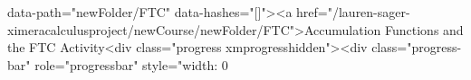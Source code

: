data-path="newFolder/FTC" data-hashes="[]"><a href="/lauren-sager-ximeracalculusproject/newCourse/newFolder/FTC">Accumulation Functions and the FTC Activity<div class="progress xmprogresshidden"><div class="progress-bar" role="progressbar" style="width: 0%